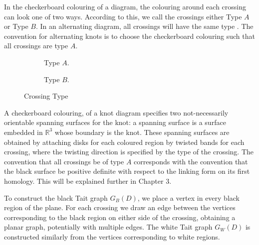 \documentclass[12pt]{report}
\newcommand{\R}{\mathbb{R}}
\begin{document}
In the checkerboard colouring of a diagram, the colouring around each crossing can look one of two ways. According to this, we call the crossings either Type $A$ or Type $B$. In an alternating diagram, all crossings will have the same type \cite[300]{spanning-tree-expansion-jones-polynomial}. The convention for alternating knots is to choose the checkerboard colouring such that all crossings are type $A$.

\begin{figure}[hbt]
	\centering
	\hspace*{\fill}
	\begin{subfigure}[b]{0.4 \textwidth}
		\centering
		\def\svgscale{0.28}
		
		\caption{Type $A$.}
		\label{fig:type-a}
	\end{subfigure}
	\hspace*{\fill} \hspace*{\fill}	\hspace*{\fill}
	\begin{subfigure}[b]{0.4 \textwidth}
		\centering
		\def\svgscale{0.28}
		
		\caption{Type $B$.}
		\label{fig:type-b}
	\end{subfigure}
	\hspace*{\fill} 
	\caption{Crossing Type}
	\label{fig:crossing-type}
\end{figure}


A checkerboard colouring, of a knot diagram specifies two not-necessarily orientable spanning surfaces for the knot: a spanning surface is a surface embedded in $\R^{3}$ whose boundary is the knot. These spanning surfaces are obtained by attaching disks for each coloured region by twisted bands for each crossing, where the twisting direction is specified by the type of the crossing. The convention that all crossings be of type $A$ corresponds with the convention that the black surface be positive definite with respect to the linking form on its first homology. This will be explained further in Chapter 3.

To construct the black Tait graph $G_{B}(D)$, we place a vertex in every black region of the plane. For each crossing we draw an edge between the vertices corresponding to the black region on either side of the crossing, obtaining a planar graph, potentially with multiple edges. The white Tait graph $G_{W}(D)$ is constructed similarly from the vertices corresponding to white regions.
\end{document}
